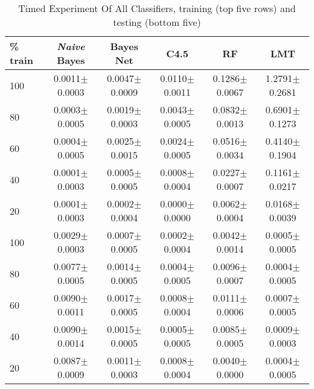 \documentclass{cmppgr}
\begin{document}
\begin{table*}[t]
	\centering
	\caption{Timed Experiment Of All Classifiers, training (top five rows) and testing (bottom five) }
	\begin{tabular}{|l|c|c|c|c|c|}
		\hline
		\% train &\textit{Naive} Bayes  &Bayes Net &C4.5&RF & LMT \\\hline\hline
		100    & 0.0011$\pm$0.0003 &   0.0047$\pm$0.0009 &    0.0110$\pm$0.0011 &   0.1286$\pm$0.0067 &   1.2791$\pm$0.2681 	\\
		80    & 0.0003$\pm$0.0005  &  0.0019$\pm$0.0003  &  0.0043$\pm$0.0005  &   0.0832$\pm$0.0013  &  0.6901$\pm$0.1273 \\
		60    &  0.0004$\pm$0.0005 &    0.0025$\pm$0.0015   &   0.0024$\pm$0.0005&    0.0516$\pm$0.0034&    0.4140$\pm$0.1904  \\
		40    &  0.0001$\pm$0.0003   &    0.0005$\pm$0.0005    &    0.0008$\pm$0.0004    &    0.0227$\pm$0.0007   &    0.1161$\pm$0.0217 	\\
		20    &  0.0001$\pm$0.0003&   0.0002$\pm$0.0004 &     0.0000$\pm$0.0000 &     0.0062$\pm$0.0004 &   0.0168$\pm$0.0039	\\\hline\hline 
		
			100    & 0.0029$\pm$0.0003  &   0.0007$\pm$0.0005  &  0.0002$\pm$0.0004 &   0.0042$\pm$0.0014   &   0.0005$\pm$0.0005 	\\
		80    & 0.0077$\pm$0.0005  &   0.0014$\pm$0.0005  &   0.0004$\pm$0.0005  &   0.0096$\pm$0.0007  &  0.0004$\pm$0.0005	\\
		60    &  0.0090$\pm$0.0011 &   0.0017$\pm$0.0005 &   0.0008$\pm$0.0004&   0.0111$\pm$0.0006 &   0.0007$\pm$0.0005	\\
		40    & 0.0090$\pm$0.0014 &   0.0015$\pm$0.0005  &   0.0005$\pm$0.0005  &   0.0085$\pm$0.0005   &   0.0009$\pm$0.0003 	\\
		20    &0.0087$\pm$0.0009  &   0.0011$\pm$0.0003  &  0.0008$\pm$0.0004  &   0.0040$\pm$0.0000  &    0.0004$\pm$0.0005 \\\hline 
		
	\end{tabular}
\end{table*}
\end{document}

